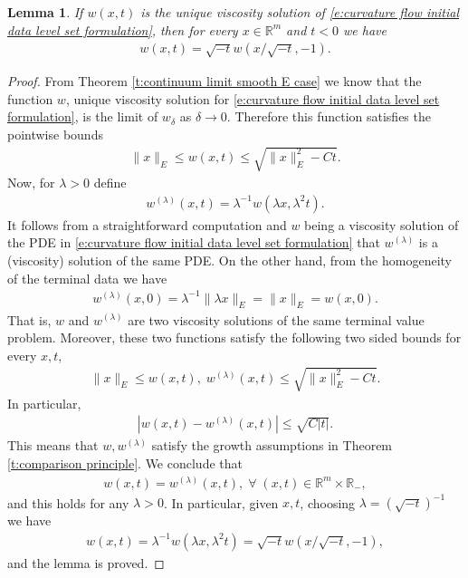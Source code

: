 \documentclass[reqno]{amsart}
\newtheorem{lemma}[theorem]{Lemma}
\numberwithin{equation}{section}
\begin{document}
\begin{lemma}\label{l:solution is self similar}
  If $w(x,t)$ is the unique viscosity solution of \eqref{e:curvature flow initial data level set formulation}, then for every $x \in \mathbb{R}^m$ and $t<0$ we have
  \begin{align*}
    w(x,t) = \sqrt{-t}w(x/\sqrt{-t},-1).    
  \end{align*}
    
\end{lemma}

\begin{proof}
    From Theorem \ref{t:continuum limit smooth E case} we know that the function $w$, unique viscosity solution for \eqref{e:curvature flow initial data level set formulation}, is the limit of $w_\delta$ as $\delta\to 0$. Therefore this function satisfies the pointwise bounds
    \begin{align*}
      \|x\|_E \leq w(x,t) \leq \sqrt{\|x\|_E^2-Ct}.    
    \end{align*}    
    Now, for $\lambda>0$ define 
    \begin{align*}
      w^{(\lambda)}(x,t) = \lambda^{-1}w(\lambda x,\lambda^2 t).    
    \end{align*}
    It follows from a straightforward computation and $w$ being a viscosity solution of the PDE in \eqref{e:curvature flow initial data level set formulation} that $w^{(\lambda)}$ is a (viscosity) solution of the same PDE. On the other hand, from the homogeneity of the terminal data we have
    \begin{align*}
      w^{(\lambda)}(x,0) = \lambda^{-1} \|\lambda x\|_E = \|x\|_E = w(x,0).    
    \end{align*}
    That is, $w$ and $w^{(\lambda)}$ are two viscosity solutions of the same terminal value problem. Moreover, these two functions satisfy the following two sided bounds for every $x,t$,
    \begin{align*}
      \|x\|_E \leq w(x,t),\;w^{(\lambda)}(x,t)  \leq \sqrt{\|x\|^2_E-Ct}.
    \end{align*}
    In particular, 
    \begin{align*}
       |w(x,t)-w^{(\lambda)}(x,t)|\leq \sqrt{C|t|}.   
    \end{align*}
    This means that $w,w^{(\lambda)}$ satisfy the growth assumptions in Theorem \ref{t:comparison principle}. We conclude that 
    \begin{align*}
      w(x,t) = w^{(\lambda)}(x,t),\;\forall\;(x,t) \in \mathbb{R}^m\times \mathbb{R}_-,    
    \end{align*}
    and this holds for any $\lambda>0$. In particular, given $x,t$, choosing $\lambda = (\sqrt{-t})^{-1}$ we have
    \begin{align*}
      w(x,t) = \lambda^{-1}w(\lambda x,\lambda^2t) = \sqrt{-t}w(x/\sqrt{-t},-1),
    \end{align*}
    and the lemma is proved.
\end{proof}
\end{document}
